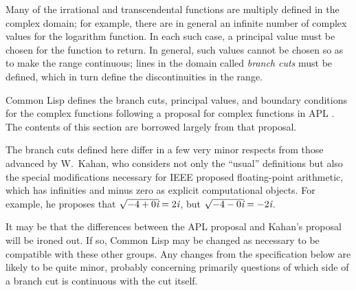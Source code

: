 Many of the irrational and transcendental functions are multiply defined
in the complex domain; for example, there are in general an infinite
number of complex values for the logarithm function.  In each such
case, a principal value must be chosen for the function to return.
In general, such values cannot be chosen so as to make the range
continuous; lines in the domain
called \emph{branch cuts} must be defined, which in turn
define the discontinuities in the range.

Common Lisp defines the branch cuts, principal values, and boundary
conditions for the complex functions following
a proposal for complex functions in APL \cite{APL-BRANCH-CUTS}.
The contents of this section are borrowed largely from that proposal.

\beforenoterule
\begin{incompatibility}
The branch cuts defined here differ in a few very minor
respects from those advanced by W.~Kahan, who considers not only the
``usual'' definitions but also the special modifications necessary for
{IEEE} proposed floating-point arithmetic, which has infinities and
minus zero as explicit computational objects.  For example, he proposes
that $\sqrt{-4+0\emph{i}}=2\emph{i}$, but $\sqrt{-4-0\emph{i}}=-2\emph{i}$.

It may be that the differences between the APL proposal and Kahan's
proposal will be ironed out.  If so, Common Lisp may be
changed as necessary to be compatible with these other groups.  Any changes
from the specification below are likely to be quite minor,
probably concerning primarily questions of which side of a branch cut
is continuous with the cut itself.
\end{incompatibility}
\afternoterule

